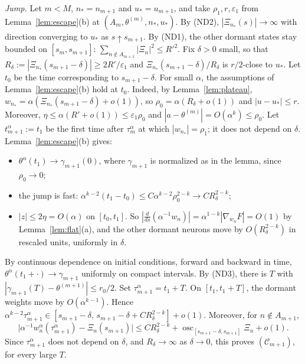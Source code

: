 \documentclass[11pt]{article}
\theoremstyle{definition}
\theoremstyle{remark}
\newcommand{\eps}{\varepsilon}
\newcommand{\ND}[1]{\textup{(ND#1)}}
\begin{document}
\emph{Jump.} Let $m<M$, $n_*=n_{m+1}$ and $u_*=u_{m+1}$, and take $\rho_1,r,\eps_1$ from Lemma~\ref{lem:escape}(b) at $(A_m,\theta^{(m)},n_*,u_*)$. By \ND2, $|\Xi_{n_*}(s)|\to\infty$ with direction converging to $u_*$ as $s\uparrow s_{m+1}$. By \ND1, the other dormant states stay bounded on $[s_m,s_{m+1}]$: $\sum_{n\notin A_{m+1}}|\Xi_n|^2\le R'^2$. Fix $\delta>0$ small, so that $R_\delta:=|\Xi_{n_*}(s_{m+1}-\delta)|\ge2R'/\eps_1$ and $\Xi_{n_*}(s_{m+1}-\delta)/R_\delta$ is $r/2$-close to $u_*$. Let $t_0$ be the time corresponding to $s_{m+1}-\delta$. For small $\alpha$, the assumptions of Lemma~\ref{lem:escape}(b) hold at $t_0$. Indeed, by Lemma~\ref{lem:plateau}, $w_{n_*}=\alpha(\Xi_{n_*}(s_{m+1}-\delta)+o(1))$, so $\rho_0=\alpha(R_\delta+o(1))$ and $|u-u_*|\le r$. Moreover, $\eta\le\alpha(R'+o(1))\le\eps_1\rho_0$ and $|a-\theta^{(m)}|=O(\alpha^k)\le\rho_0$. Let $t^\alpha_{m+1}:=t_1$ be the first time after $\tau^\alpha_m$ at which $|w_{n_*}|=\rho_1$; it does not depend on $\delta$. Lemma~\ref{lem:escape}(b) gives:
\begin{itemize}[nosep]
\item $\theta^\alpha(t_1)\to\gamma_{m+1}(0)$, where $\gamma_{m+1}$ is normalized as in the lemma, since $\rho_0\to0$;
\item the jump is fast: $\alpha^{k-2}(t_1-t_0)\le C\alpha^{k-2}\rho_0^{2-k}\to CR_\delta^{2-k}$;
\item $|z|\le2\eta=O(\alpha)$ on $[t_0,t_1]$. So $|\frac{d}{ds}(\alpha^{-1}w_n)|=\alpha^{1-k}|\nabla_{w_n}F|=O(1)$ by Lemma~\ref{lem:flat}(a), and the other dormant neurons move by $O(R_\delta^{2-k})$ in rescaled units, uniformly in $\delta$.
\end{itemize}
By continuous dependence on initial conditions, forward and backward in time, $\theta^\alpha(t_1+\cdot)\to\gamma_{m+1}$ uniformly on compact intervals. By \ND3, there is $T$ with $|\gamma_{m+1}(T)-\theta^{(m+1)}|\le r_0/2$. Set $\tau^\alpha_{m+1}=t_1+T$. On $[t_1,t_1+T]$, the dormant weights move by $O(\alpha^{k-1})$. Hence $\alpha^{k-2}\tau^\alpha_{m+1}\in[s_{m+1}-\delta,\,s_{m+1}-\delta+CR_\delta^{2-k}]+o(1)$. Moreover, for $n\notin A_{m+1}$,
\[
\big|\alpha^{-1}w_n^\alpha(\tau^\alpha_{m+1})-\Xi_n(s_{m+1})\big|\le CR_\delta^{2-k}+\operatorname{osc}_{[s_{m+1}-\delta,s_{m+1}]}\Xi_n+o(1).
\]
Since $\tau^\alpha_{m+1}$ does not depend on $\delta$, and $R_\delta\to\infty$ as $\delta\to0$, this proves $(\mathcal C_{m+1})$, for every large $T$.
\end{document}
